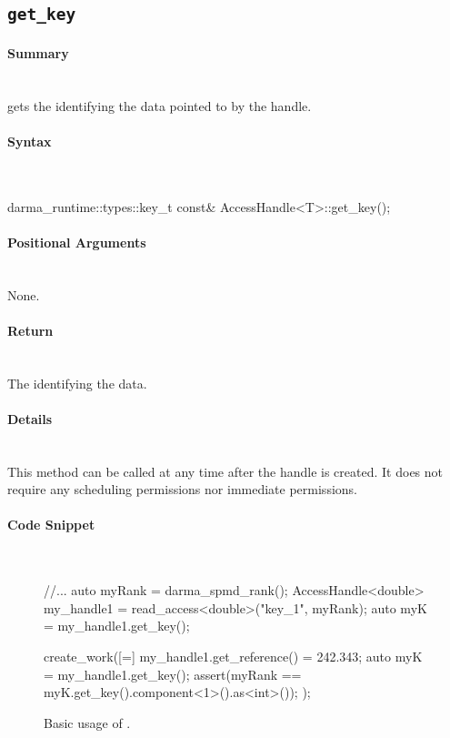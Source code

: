 \subsection{\texttt{get\_key}}

\paragraph{Summary}\mbox{}\\ 
 gets the  identifying the data pointed to by
the \gls{handle}.

\paragraph{Syntax}\mbox{}\\ 
\begin{CppCode}
darma_runtime::types::key_t const& AccessHandle<T>::get_key();
\end{CppCode}

\paragraph{Positional Arguments}\mbox{}\\ 
None.

\paragraph{Return}\mbox{}\\ 
The  identifying the data.

\paragraph{Details}\mbox{}\\ 
This method can be called at any time after the \gls{handle} is created.  It does not
require any \gls{scheduling permissions} nor \gls{immediate permissions}.

\paragraph{Code Snippet}\mbox{}\\ 
\begin{figure}[!h]
\begin{CppCodeNumb}
//...
auto myRank = darma_spmd_rank();
AccessHandle<double> my_handle1 = read_access<double>("key_1", myRank);
auto myK = my_handle1.get_key();

create_work([=]{
	my_handle1.get_reference() = 242.343;
	auto myK = my_handle1.get_key();
	assert(myRank == myK.get_key().component<1>().as<int>());
});
\end{CppCodeNumb}
\label{fig:fe_api_get_key}
\caption{Basic usage of \protect{}.}
\end{figure}




